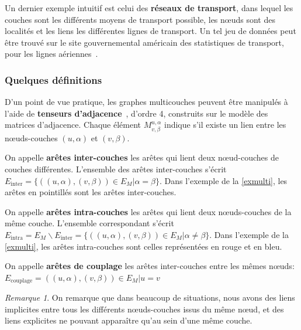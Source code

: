 \documentclass[11pt,a4paper]{article}
\theoremstyle{definition}
\theoremstyle{remark}
\newtheorem{rmq}{Remarque}
\theoremstyle{remark}
\begin{document}
Un dernier exemple intuitif est celui des \textbf{réseaux de transport}, dans lequel les couches sont les différents moyens de transport possible, les nœuds sont des localités et les liens les différentes lignes de transport. Un tel jeu de données peut être trouvé sur le site gouvernemental américain des statistiques de transport, pour les lignes aériennes~\cite{plane}.








\subsubsection{Quelques définitions}




D'un point de vue pratique, les graphes multicouches peuvent être manipulés à l'aide de \textbf{tenseurs d'adjacence}~\cite{mldd}, d'ordre 4, construits sur le modèle des matrices d'adjacence. Chaque élément $M^{u,\alpha}_{v,\beta}$ indique s'il existe un lien entre les nœuds-couches $(u,\alpha)$ et $(v,\beta)$.


	On appelle \textbf{arêtes inter-couches} les arêtes qui lient deux nœud-couches de couches différentes. L'ensemble des arêtes inter-couches s'écrit $E_{\text{inter}} = \{((u,\alpha),(v,\beta)) \in E_M | \alpha = \beta\}$. 
	Dans l'exemple de la \cref{exmulti}, les arêtes en pointillés sont les arêtes inter-couches.
	
	On appelle \textbf{arêtes intra-couches} les arêtes qui lient deux n\oe{}uds-couches de la même couche. L'ensemble correspondant s'écrit $E_{\text{intra}} = E_M\backslash E_{\text{inter}}= \{((u,\alpha),(v,\beta)) \in E_M | \alpha \neq \beta\}$.
	Dans l'exemple de la \cref{exmulti}, les arêtes intra-couches sont celles représentées en rouge et en bleu.
	
	On appelle \textbf{arêtes de couplage} les arêtes inter-couches entre les mêmes n\oe{}uds: $E_{\text{couplage}}={((u,\alpha),(v,\beta)) \in E_M | u=v} $
	
	\begin{rmq}
    On remarque que dans beaucoup de situations, nous avons des liens \og{}implicites\fg{} entre tous les différents n\oe{}uds-couches issus du même n\oe{}ud, et des liens \og explicites \fg{} ne pouvant apparaître qu'au sein d'une même couche.
    \end{rmq}
    
\end{document}

